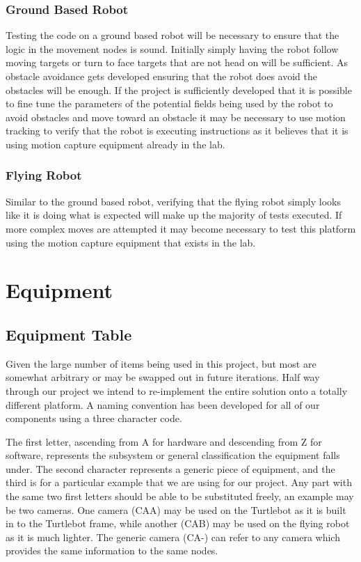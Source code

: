 \documentclass{article}
\begin{document}
	\subsubsection{Ground Based Robot}
	
	Testing the code on a ground based robot will be necessary to ensure that the logic in the movement nodes is sound. Initially simply having the robot follow moving targets or turn to face targets that are not head on will be sufficient. As obstacle avoidance gets developed ensuring that the robot does avoid the obstacles will be enough. If the project is sufficiently developed that it is possible to fine tune the parameters of the potential fields being used by the robot to avoid obstacles and move toward an obstacle it may be necessary to use motion tracking to verify that the robot is executing instructions as it believes that it is using motion capture equipment already in the lab.
	
	\subsubsection{Flying Robot}
	
	Similar to the ground based robot, verifying that the flying robot simply looks like it is doing what is expected will make up the majority of tests executed. If more complex moves are attempted it may become necessary to test this platform using the motion capture equipment that exists in the lab.


\section{Equipment}

	\subsection{Equipment Table}
	
	Given the large number of items being used in this project, but most are somewhat arbitrary or may be swapped out in future iterations. Half way through our project we intend to re-implement the entire solution onto a totally different platform. A naming convention has been developed for all of our components using a three character code.
	
	The first letter, ascending from A for hardware and descending from Z for software, represents the subsystem or general classification the equipment falls under. The second character represents a generic piece of equipment, and the third is for a particular example that we are using for our project. Any part with the same two first letters should be able to be substituted freely, an example may be two cameras. One camera (CAA) may be used on the Turtlebot as it is built in to the Turtlebot frame, while another (CAB) may be used on the flying robot as it is much lighter. The generic camera (CA-) can refer to any camera which provides the same information to the same nodes.
	
\end{document}
